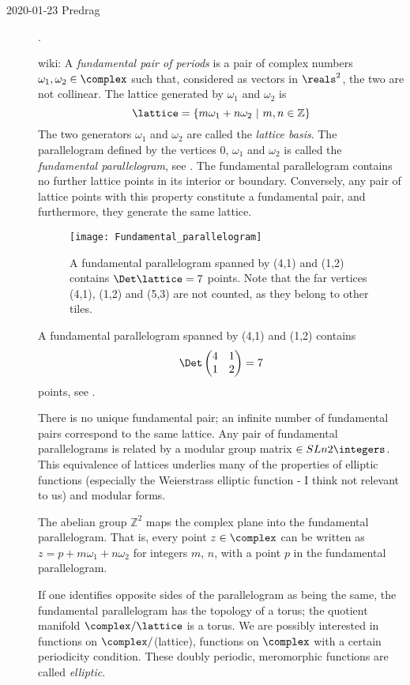 \begin{description}

\item[2020-01-23 Predrag].

 {wiki}:
A {\em fundamental pair of periods} is a pair of complex numbers
\(\omega_1,\omega_2 \in \complex\) such that, considered as vectors in
\(\reals^2\), the two are not collinear. The lattice generated by
$\omega_1$ and $\omega_2$ is
\[
\lattice=\{m\omega_1+n\omega_2 \,\,|\,\, m,n\in\mathbb{Z} \}
\]
The two generators $\omega_1$ and $\omega_2$ are called the \emph{lattice
basis}. The parallelogram defined by the vertices 0, \(\omega_1\) and
\(\omega_2\) is called the \emph{fundamental parallelogram}, see
.
The fundamental parallelogram contains no further lattice points in its
interior or boundary. Conversely, any pair of lattice points with this
property constitute a fundamental pair, and furthermore, they generate
the same lattice.

\begin{figure}
  \centering
  \texttt{[image: Fundamental\_parallelogram]}
  \caption{\label{fig:FundParall}
A fundamental parallelogram spanned by (4,1) and (1,2) contains
${\Det \lattice = 7}$
points. Note that the far vertices (4,1), (1,2)  and (5,3) are not
counted, as they belong to other tiles.}
\end{figure}

A fundamental parallelogram spanned by (4,1) and (1,2) contains
\[
\Det\begin{pmatrix}
             4 & 1 \\
             1 & 2
      \end{pmatrix} = 7
\]
points, see .

There is no unique fundamental pair; an infinite number of fundamental
pairs correspond to the same lattice. Any pair of fundamental
parallelograms is related by a modular group matrix
\(\in{SL}n{2}{\integers}\).  This equivalence of lattices underlies
many of the properties of elliptic functions (especially the Weierstrass
elliptic function - I think not relevant to us) and modular forms.

The abelian group \(\mathbb{Z}^2\) maps the complex plane
into the fundamental parallelogram. That is, every point \(z \in
\complex\) can be written as \(z=p+m\omega_1+n\omega_2\)
for integers $m$, $n$, with  a point $p$ in the fundamental
parallelogram.

If one identifies opposite sides of the parallelogram as
being the same, the fundamental parallelogram has the topology of a
torus; the quotient manifold
\(\complex/\lattice\) is a torus.
We are
possibly interested in functions on $\complex/$(lattice), functions on
$\complex$ with a certain periodicity condition. These doubly periodic,
meromorphic functions are called \emph{elliptic}.

\end{description}

